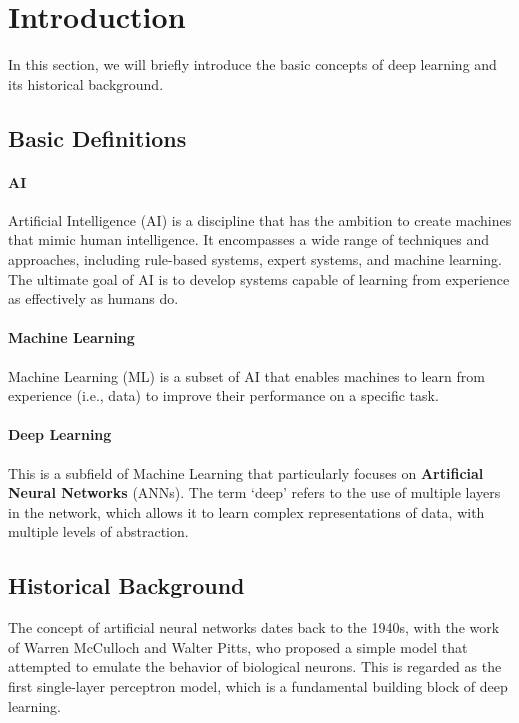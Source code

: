 \section{Introduction}
In this section, we will briefly introduce the basic concepts of deep learning and its historical background.

\subsection{Basic Definitions}
\paragraph{AI}
Artificial Intelligence (AI) is a discipline that has the ambition to create machines that
mimic human intelligence. It encompasses a wide range of techniques and approaches, including rule-based systems, expert systems, and machine learning.
The ultimate goal of AI is to develop systems capable of learning from experience as effectively as humans do.

\paragraph{Machine Learning}
Machine Learning (ML) is a subset of AI that enables machines to learn
from experience (i.e., data) to improve their performance on a specific task.

\paragraph{Deep Learning}
This is a subfield of Machine Learning that particularly focuses on
\textbf{Artificial Neural Networks} (ANNs). The term `deep' refers to the use of multiple layers
in the network, which allows it to learn complex representations of data, with multiple levels of abstraction.

\subsection{Historical Background}
The concept of artificial neural networks dates back to the 1940s, with the work of Warren McCulloch and Walter Pitts, who proposed a simple model that
attempted to emulate the behavior of biological neurons.
This is regarded as the first single-layer perceptron model, which is a fundamental building block of deep learning.


